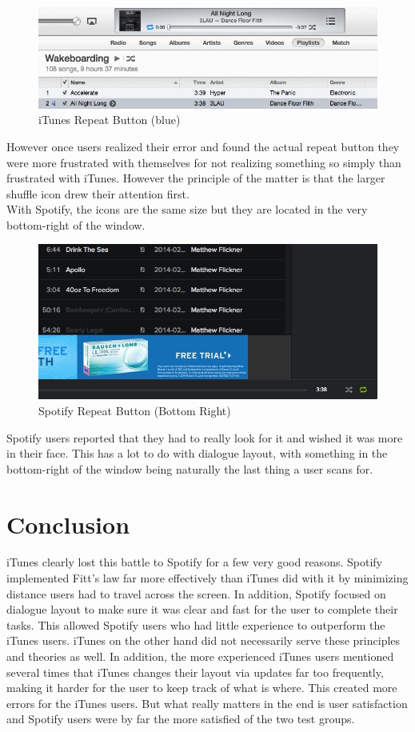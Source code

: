 \documentclass[a4paper]{article}
\begin{document}
\begin{figure}[H]
\centering
\includegraphics[width=.6\textwidth]{itunesrepeat.jpg}
\caption{\label{heuristic: iTunesRepeat} iTunes Repeat Button (blue)}
\end{figure}

However once users realized their error and found the actual repeat button they were more frustrated with themselves for not realizing something so simply than frustrated with iTunes. However the principle of the matter is that the larger shuffle icon drew their attention first.\\

With Spotify, the icons are the same size but they are located in the very bottom-right of the window.

\begin{figure}[H]
\centering
\includegraphics[width=.6\textwidth]{spotifyrepeat.jpg}
\caption{\label{heuristic: SpotifyRepeat} Spotify Repeat Button (Bottom Right)}
\end{figure}

Spotify users reported that they had to really look for it and wished it was more in their face. This has a lot to do with dialogue layout, with something in the bottom-right of the window being naturally the last thing a user scans for.

\section{Conclusion}
iTunes clearly lost this battle to Spotify for a few very good reasons. Spotify implemented Fitt's law far more effectively than iTunes did with it by minimizing distance users had to travel across the screen. In addition, Spotify focused on dialogue layout to make sure it was clear and fast for the user to complete their tasks. This allowed Spotify users who had little experience to outperform the iTunes users. iTunes on the other hand did not necessarily serve these principles and theories as well. In addition, the more experienced iTunes users mentioned several times that iTunes changes their layout via updates far too frequently, making it harder for the user to keep track of what is where. This created more errors for the iTunes users. But what really matters in the end is user satisfaction and Spotify users were by far the more satisfied of the two test groups.
\end{document}
